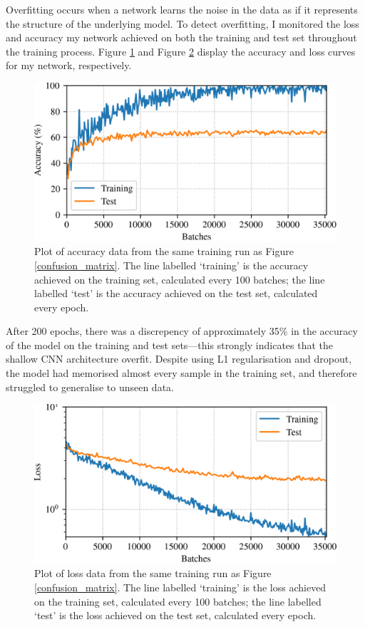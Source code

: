 \documentclass[conference]{IEEEtran}
\begin{document}
Overfitting occurs when a network learns the noise in the data as if it represents the structure of the underlying model.
To detect overfitting, I monitored the loss and accuracy my network achieved on both the training and test set throughout the training process.
Figure \ref{accuracy_curves} and Figure \ref{loss_curves} display the accuracy and loss curves for my network, respectively.

\begin{figure}[htbp]
    \centerline{\includegraphics[width=\columnwidth]{accuracy.png}}
    \caption{
        Plot of accuracy data from the same training run as Figure \ref{confusion_matrix}.
        The line labelled `training' is the accuracy achieved on the training set, calculated every 100 batches; the line labelled `test' is the accuracy achieved on the test set, calculated every epoch.}
    \label{accuracy_curves}
\end{figure}

After 200 epochs, there was a discrepency of approximately 35\% in the accuracy of the model on the training and test sets---this strongly indicates that the shallow CNN architecture overfit.
Despite using L1 regularisation and dropout, the model had memorised almost every sample in the training set, and therefore struggled to generalise to unseen data.

\begin{figure}[htbp]
    \centerline{\includegraphics[width=\columnwidth]{loss.png}}
    \caption{
        Plot of loss data from the same training run as Figure \ref{confusion_matrix}.
        The line labelled `training' is the loss achieved on the training set, calculated every 100 batches; the line labelled `test' is the loss achieved on the test set, calculated every epoch.
    }
    \label{loss_curves}
\end{figure}
\end{document}
